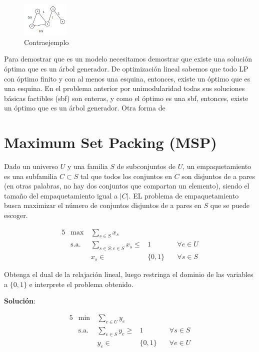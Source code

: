 \documentclass[10pt]{article}
\theoremstyle{plain}
\theoremstyle{definition}
\begin{document}
\begin{itemize}
\begin{figure}[h]
    \centering
    \includegraphics[width=0.2\textwidth]{graph.png}
    \caption{Contraejemplo}
\end{figure}

Para demostrar que es un modelo necesitamos demostrar que existe una solución óptima que es un árbol generador.
De optimización lineal sabemos que todo LP con óptimo finito y con al menos una esquina, entonces, existe un óptimo que es una esquina. En el problema anterior por unimodularidad todas sus soluciones básicas factibles (sbf) son enteras, y como el óptimo es una sbf, entonces, existe un óptimo que es un árbol generador. Otra forma de

\section{Maximum Set Packing (MSP)}

 Dado un universo $U$ y una familia $S$ de subconjuntos de $U$, un empaquetamiento es una subfamilia $C\subset S$ tal que todos los conjuntos en $C$ son disjuntos de a pares (en otras palabras, no hay dos conjuntos que compartan un elemento), siendo el tamaño del empaquetamiento igual a $|C|$. EL problema de empaquetamiento busca maximizar el número de conjuntos disjuntos de a pares en $S$ que se puede escoger.

\begin{center}
\begin{alignat*}{5}
&\max\ & \sum_{s \in S}x_{s}\\
&\text{s.a. } &  \sum_{s \in S:e \in S}x_{s}  \leq  &1 &\quad \forall e \in U\\
&& x_{s}  \in  &\{0,1\} &\quad \forall s \in S
\end{alignat*}
\end{center}

Obtenga el dual de la relajación lineal, luego restringa el dominio de las variables a $\{0,1\}$ e interprete el problema obtenido.

\textbf{Solución}:\\

\begin{center}
\begin{alignat*}{5}
&\min\ & \sum_{e \in U}y_{e}\\
&\text{s.a. } &  \sum_{e \in S}y_{e}  \geq  &1 &\quad \forall s \in S\\
&& y_{e}  \in  &\{0,1\} &\quad \forall e \in U
\end{alignat*}
\end{center}


\end{itemize}
\end{document}
